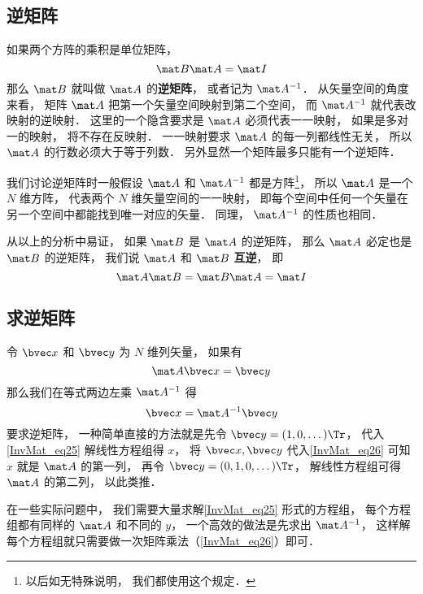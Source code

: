 

\subsection{逆矩阵}

如果两个方阵的乘积是单位矩阵， 
\begin{equation}
\mat B \mat A = \mat I
\end{equation}
那么 $\mat B$ 就叫做 $\mat A$ 的\textbf{逆矩阵}， 或者记为 $\mat A^{-1}$． 从矢量空间的角度来看， 矩阵 $\mat A$ 把第一个矢量空间映射到第二个空间， 而 $\mat A^{-1}$ 就代表改映射的逆映射． 这里的一个隐含要求是 $\mat A$ 必须代表一一映射， 如果是多对一的映射， 将不存在反映射． 一一映射要求 $\mat A$ 的每一列都线性无关，%
所以 $\mat A$ 的行数必须大于等于列数． 另外显然一个矩阵最多只能有一个逆矩阵．

我们讨论逆矩阵时一般假设 $\mat A$ 和 $\mat A^{-1}$ 都是方阵\footnote{以后如无特殊说明， 我们都使用这个规定．}， 所以 $\mat A$ 是一个 $N$ 维方阵， 代表两个 $N$ 维矢量空间的一一映射， 即每个空间中任何一个矢量在另一个空间中都能找到唯一对应的矢量． 同理， $\mat A^{-1}$ 的性质也相同．

从以上的分析中易证， 如果 $\mat B$ 是 $\mat A$ 的逆矩阵， 那么 $\mat A$ 必定也是 $\mat B$ 的逆矩阵， 我们说 $\mat A$ 和 $\mat B$ \textbf{互逆}， 即
\begin{equation}\label{InvMat_eq2}
\mat A \mat B = \mat B \mat A = \mat I
\end{equation}

\subsection{求逆矩阵}
令 $\bvec x$ 和 $\bvec y$ 为 $N$ 维列矢量， 如果有
\begin{equation}\label{InvMat_eq25}
\mat A \bvec x = \bvec y
\end{equation}
那么我们在等式两边左乘 $\mat A^{-1}$ 得
\begin{equation}\label{InvMat_eq26}
\bvec x = \mat A^{-1} \bvec y
\end{equation}
要求逆矩阵， 一种简单直接的方法就是先令 $\bvec y = (1, 0, \dots)\Tr$， 代入\autoref{InvMat_eq25} 解线性方程组得 $x$， 将 $\bvec x, \bvec y$ 代入\autoref{InvMat_eq26} 可知 $x$ 就是 $\mat A$ 的第一列， 再令 $\bvec y = (0, 1, 0, \dots)\Tr$， 解线性方程组可得 $\mat A$ 的第二列， 以此类推．

在一些实际问题中， 我们需要大量求解\autoref{InvMat_eq25} 形式的方程组， 每个方程组都有同样的 $\mat A$ 和不同的 $y$， 一个高效的做法是先求出 $\mat A^{-1}$， 这样解每个方程组就只需要做一次矩阵乘法（\autoref{InvMat_eq26}）即可．




